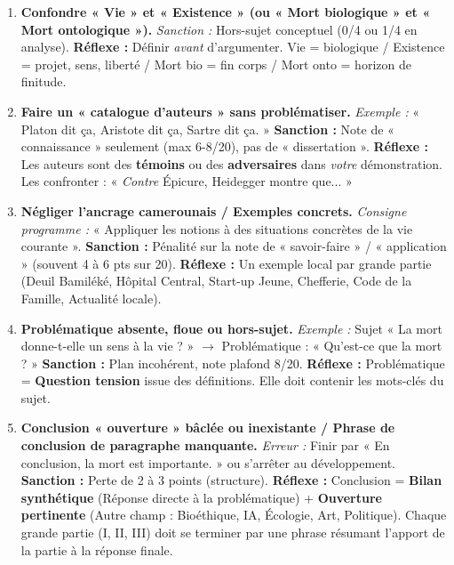 \documentclass[11pt]{article}
\begin{document}
\begin{attention}
\begin{enumerate}
    \item \textbf{Confondre « Vie » et « Existence » (ou « Mort biologique » et « Mort ontologique »).} \textit{Sanction :} Hors-sujet conceptuel (0/4 ou 1/4 en analyse). \textbf{Réflexe :} Définir \emph{avant} d'argumenter. Vie = biologique / Existence = projet, sens, liberté / Mort bio = fin corps / Mort onto = horizon de finitude.
    \item \textbf{Faire un « catalogue d'auteurs » sans problématiser.} \textit{Exemple :} « Platon dit ça, Aristote dit ça, Sartre dit ça. » \textbf{Sanction :} Note de « connaissance » seulement (max 6-8/20), pas de « dissertation ». \textbf{Réflexe :} Les auteurs sont des \textbf{témoins} ou des \textbf{adversaires} dans \emph{votre} démonstration. Les confronter : « \emph{Contre} Épicure, Heidegger montre que... »
    \item \textbf{Négliger l'ancrage camerounais / Exemples concrets.} \textit{Consigne programme :} « Appliquer les notions à des situations concrètes de la vie courante ». \textbf{Sanction :} Pénalité sur la note de « savoir-faire » / « application » (souvent 4 à 6 pts sur 20). \textbf{Réflexe :} Un exemple local par grande partie (Deuil Bamiléké, Hôpital Central, Start-up Jeune, Chefferie, Code de la Famille, Actualité locale).
    \item \textbf{Problématique absente, floue ou hors-sujet.} \textit{Exemple :} Sujet « La mort donne-t-elle un sens à la vie ? » $\to$ Problématique : « Qu'est-ce que la mort ? » \textbf{Sanction :} Plan incohérent, note plafond 8/20. \textbf{Réflexe :} Problématique = \textbf{Question tension} issue des définitions. Elle doit contenir les mots-clés du sujet.
    \item \textbf{Conclusion « ouverture » bâclée ou inexistante / Phrase de conclusion de paragraphe manquante.} \textit{Erreur :} Finir par « En conclusion, la mort est importante. » ou s'arrêter au développement. \textbf{Sanction :} Perte de 2 à 3 points (structure). \textbf{Réflexe :} Conclusion = \textbf{Bilan synthétique} (Réponse directe à la problématique) + \textbf{Ouverture pertinente} (Autre champ : Bioéthique, IA, Écologie, Art, Politique). Chaque grande partie (I, II, III) doit se terminer par une phrase résumant l'apport de la partie à la réponse finale.
\end{enumerate}
\end{attention}
\end{document}
